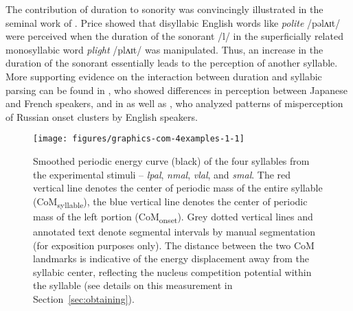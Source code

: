 The contribution of duration to sonority was convincingly illustrated in the seminal work of \citet{price1980sonority}. Price showed that disyllabic English words like \emph{polite} /pəlʌɪt/ were perceived when the duration of the sonorant /l/ in the superficially related monosyllabic word \emph{plight} /plʌɪt/ was manipulated. Thus, an increase in the duration of the sonorant essentially leads to the perception of another syllable. 
More supporting evidence on the interaction between duration and syllabic parsing can be found in \citet{dupoux1999epentheticsk}, who showed differences in perception between Japanese and French speakers, and in \citet{berent2007we} as well as \citet{wilson2014effects}, who analyzed patterns of misperception of Russian onset clusters by English speakers.

\begin{figure}

{\centering \texttt{[image: figures/graphics-com-4examples-1-1]} 

}

\caption{Smoothed periodic energy curve (black) of the four syllables from the experimental stimuli -- \emph{lpal}, \emph{nmal}, \emph{vlal}, and \emph{smal}. The red vertical line denotes the center of periodic mass of the entire syllable ({CoM\textsubscript{syllable}}), the blue vertical line denotes the center of periodic mass of the left portion ({CoM\textsubscript{onset}}). Grey dotted vertical lines and annotated text denote segmental intervals by manual segmentation (for exposition purposes only). The distance between the two CoM landmarks is indicative of the energy displacement away from the syllabic center, reflecting the nucleus competition potential within the syllable (see details on this measurement in Section~\ref{sec:obtaining}).}\label{fig:com-4examples-1}
\end{figure}


